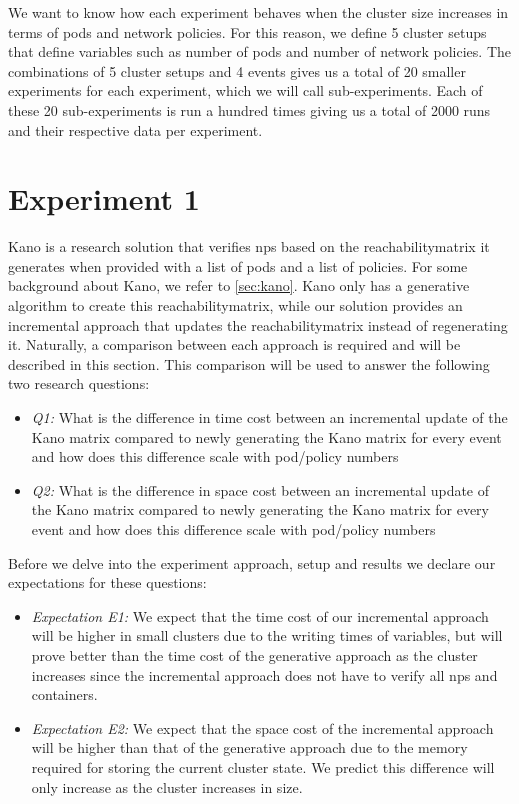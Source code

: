 We want to know how each experiment behaves when the cluster size increases in terms of pods and network policies. For this reason, we define 5 cluster setups that define variables such as number of pods and number of network policies. The combinations of 5 cluster setups and 4 events gives us a total of 20 smaller experiments for each experiment,  which we will call sub-experiments.  Each of these 20 sub-experiments is run a hundred times giving us a total of 2000 runs and their respective data per experiment.
\\[10pt]


\section{Experiment 1}\label{sec:experiment1}
Kano is a research solution that verifies \acrshort{np}s based on the reachabilitymatrix it generates when provided with a list of pods and a list of policies. For some background about Kano, we refer to \autoref{sec:kano}. Kano only has a generative algorithm to create this reachabilitymatrix, while our solution provides an incremental approach that updates the reachabilitymatrix instead of regenerating it. Naturally, a comparison between each approach is required and will be described in this section. This comparison will be used to answer the following two research questions:

\begin{itemize}
    \item \textit{Q1:} What is the difference in time cost between an incremental update of the Kano matrix compared to newly generating the Kano matrix for every event and how does this difference scale with pod/policy numbers
    \item \textit{Q2:} What is the difference in space cost between an incremental update of the Kano matrix compared to newly generating the Kano matrix for every event and how does this difference scale with pod/policy numbers
\end{itemize}

Before we delve into the experiment approach, setup and results we declare our expectations for these questions:

\begin{itemize}
    \item \textit{Expectation E1:} We expect that the time cost of our incremental approach will be higher in small clusters due to the writing times of variables, but will prove better than the time cost of the generative approach as the cluster increases since the incremental approach does not have to verify all \acrshort{np}s and containers.
    \item \textit{Expectation E2:} We expect that the space cost of the incremental approach will be higher than that of the generative approach due to the memory required for storing the current cluster state. We predict this difference will only increase as the cluster increases in size.
\end{itemize}

